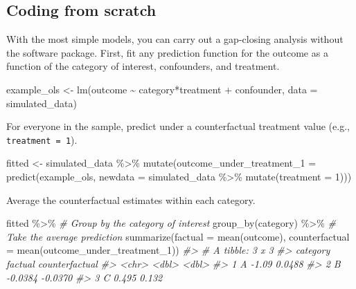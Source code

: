 \documentclass[
]{article}
\newenvironment{Shaded}{\begin{snugshade}}{\end{snugshade}}
\newcommand{\AttributeTok}[1]{\textcolor[rgb]{0.77,0.63,0.00}{#1}}
\newcommand{\CommentTok}[1]{\textcolor[rgb]{0.56,0.35,0.01}{\textit{#1}}}
\newcommand{\DecValTok}[1]{\textcolor[rgb]{0.00,0.00,0.81}{#1}}
\newcommand{\FunctionTok}[1]{\textcolor[rgb]{0.00,0.00,0.00}{#1}}
\newcommand{\NormalTok}[1]{#1}
\newcommand{\OtherTok}[1]{\textcolor[rgb]{0.56,0.35,0.01}{#1}}
\newcommand{\SpecialCharTok}[1]{\textcolor[rgb]{0.00,0.00,0.00}{#1}}
\begin{document}
\hypertarget{coding-from-scratch}{%
\subsection{Coding from scratch}\label{coding-from-scratch}}

With the most simple models, you can carry out a gap-closing analysis without the software package. First, fit any prediction function for the outcome as a function of the category of interest, confounders, and treatment.

\begin{Shaded}
\begin{Highlighting}[]
\NormalTok{example\_ols }\OtherTok{\textless{}{-}} \FunctionTok{lm}\NormalTok{(outcome }\SpecialCharTok{\textasciitilde{}}\NormalTok{ category}\SpecialCharTok{*}\NormalTok{treatment }\SpecialCharTok{+}\NormalTok{ confounder,}
                  \AttributeTok{data =}\NormalTok{ simulated\_data)}
\end{Highlighting}
\end{Shaded}

For everyone in the sample, predict under a counterfactual treatment value (e.g., \texttt{treatment\ =\ 1}).

\begin{Shaded}
\begin{Highlighting}[]
\NormalTok{fitted }\OtherTok{\textless{}{-}}\NormalTok{ simulated\_data }\SpecialCharTok{\%\textgreater{}\%}
  \FunctionTok{mutate}\NormalTok{(}\AttributeTok{outcome\_under\_treatment\_1 =} \FunctionTok{predict}\NormalTok{(example\_ols,}
                                             \AttributeTok{newdata =}\NormalTok{ simulated\_data }\SpecialCharTok{\%\textgreater{}\%}
                                               \FunctionTok{mutate}\NormalTok{(}\AttributeTok{treatment =} \DecValTok{1}\NormalTok{)))}
\end{Highlighting}
\end{Shaded}

Average the counterfactual estimates within each category.

\begin{Shaded}
\begin{Highlighting}[]
\NormalTok{fitted }\SpecialCharTok{\%\textgreater{}\%}
  \CommentTok{\# Group by the category of interest}
  \FunctionTok{group\_by}\NormalTok{(category) }\SpecialCharTok{\%\textgreater{}\%}
  \CommentTok{\# Take the average prediction}
  \FunctionTok{summarize}\NormalTok{(}\AttributeTok{factual =} \FunctionTok{mean}\NormalTok{(outcome),}
            \AttributeTok{counterfactual =} \FunctionTok{mean}\NormalTok{(outcome\_under\_treatment\_1))}
\CommentTok{\#\textgreater{} \# A tibble: 3 x 3}
\CommentTok{\#\textgreater{}   category factual counterfactual}
\CommentTok{\#\textgreater{}   \textless{}chr\textgreater{}      \textless{}dbl\textgreater{}          \textless{}dbl\textgreater{}}
\CommentTok{\#\textgreater{} 1 A        {-}1.09           0.0488}
\CommentTok{\#\textgreater{} 2 B        {-}0.0384        {-}0.0370}
\CommentTok{\#\textgreater{} 3 C         0.495          0.132}
\end{Highlighting}
\end{Shaded}
\end{document}
